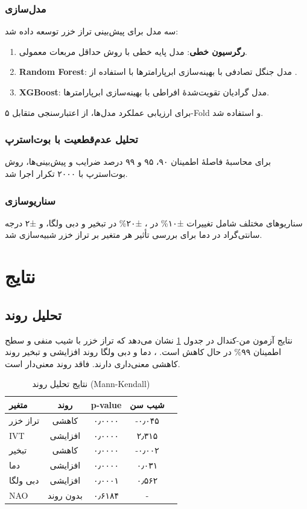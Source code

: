 \documentclass[12pt,a4paper]{article}
\begin{document}
\subsubsection{مدل‌سازی}
سه مدل برای پیش‌بینی تراز خزر توسعه داده شد:
\begin{enumerate}
\item \textbf{رگرسیون خطی}: مدل پایه خطی با روش حداقل مربعات معمولی.
\item \textbf{Random Forest}: مدل جنگل تصادفی با بهینه‌سازی ابرپارامترها با استفاده از .
\item \textbf{XGBoost}: مدل گرادیان تقویت‌شدهٔ افراطی با بهینه‌سازی ابرپارامترها.
\end{enumerate}
برای ارزیابی عملکرد مدل‌ها، از اعتبارسنجی متقابل ۵-Fold و  استفاده شد.

\subsubsection{تحلیل عدم‌قطعیت با بوت‌استرپ}
برای محاسبهٔ فاصلهٔ اطمینان ۹۰، ۹۵ و ۹۹ درصد ضرایب و پیش‌بینی‌ها، روش بوت‌استرپ با ۲۰۰۰ تکرار اجرا شد.

\subsubsection{سناریوسازی}
سناریوهای مختلف شامل تغییرات ±۱۰\% در ، ±۲۰\% در تبخیر و دبی ولگا، و ±۲ درجه سانتی‌گراد در دما برای بررسی تأثیر هر متغیر بر تراز خزر شبیه‌سازی شد.

\section{نتایج}
\subsection{تحلیل روند}
نتایج آزمون من-کندال در جدول \ref{tab:trend} نشان می‌دهد که تراز خزر با شیب منفی و سطح اطمینان ۹۹\% در حال کاهش است. ، دما و دبی ولگا روند افزایشی و تبخیر روند کاهشی معنی‌داری دارند.  فاقد روند معنی‌دار است.

\begin{table}[H]
\centering
\caption{نتایج تحلیل روند (Mann-Kendall)}
\label{tab:trend}
\begin{tabular}{lcccc}
\toprule
\textbf{متغیر} & \textbf{روند} & \textbf{p-value} & \textbf{شیب سن} \\
\midrule
تراز خزر & کاهشی & ۰٫۰۰۰۰ & -۰٫۰۴۵ \\
IVT & افزایشی & ۰٫۰۰۰۰ & ۲٫۳۱۵ \\
تبخیر & کاهشی & ۰٫۰۰۰۰ & -۰٫۰۰۲ \\
دما & افزایشی & ۰٫۰۰۰۰ & ۰٫۰۳۱ \\
دبی ولگا & افزایشی & ۰٫۰۰۰۱ & ۰٫۵۶۲ \\
NAO & بدون روند & ۰٫۶۱۸۴ & - \\
\bottomrule
\end{tabular}
\end{table}
\end{document}

